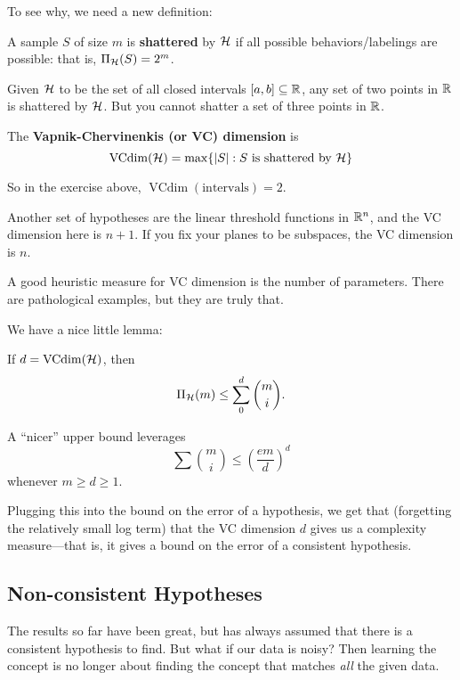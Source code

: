 \documentclass[12pt]{article}
\begin{document}
To see why, we need a new definition:
\begin{defn}
	A sample $S$ of size $m$ is \textbf{shattered} by $\mathcal{H}$ if all possible behaviors/labelings are possible: that is, $\Pi_{\mathcal{H}}(S)=2^m$.
\end{defn}
\begin{ex}
	Given $\mathcal{H}$ to be the set of all closed intervals $[a,b]\subseteq\mathbb{R}$, any set of two points in $\mathbb{R}$ is shattered by $\mathcal{H}$.
	But you cannot shatter a set of three points in $\mathbb{R}$.
\end{ex}
\begin{defn}
	The \textbf{Vapnik-Chervinenkis (or VC) dimension} is
	\[\operatorname{VCdim}(\mathcal{H})=\max\{|S|: S\text{ is shattered by }\mathcal{H}\}\]
\end{defn}
\begin{rmk}
	So in the exercise above, $\operatorname{VCdim}(\text{intervals})=2$.
\end{rmk}
Another set of hypotheses are the linear threshold functions in $\mathbb{R}^n$, and the VC dimension here is $n+1$. If you fix your planes to be subspaces, the VC dimension is $n$.

\begin{rmk}
	A good heuristic measure for VC dimension is the number of parameters. There are pathological examples, but they are truly that.
\end{rmk}

We have a nice little lemma:
\begin{lem}[Sauer]
	If $d=\operatorname{VCdim}(\mathcal{H})$, then 
	\[\Pi_{\mathcal{H}}(m)\le\sum_0^d\binom{m}{i}.\]
\end{lem}
\begin{rmk}
	A ``nicer'' upper bound leverages
	\[\sum\binom{m}{i}\le\left(\frac{em}{d}\right)^d\]
	whenever $m\ge d\ge 1$.
\end{rmk}

Plugging this into the bound on the error of a hypothesis, we get that (forgetting the relatively small log term) that the VC dimension $d$ gives us
a complexity measure---that is, it gives a bound on the error of a consistent hypothesis.

\subsection{Non-consistent Hypotheses}
The results so far have been great, but has always assumed that there is a consistent hypothesis to find. But what if our data is noisy? Then 
learning the concept is no longer about finding the concept that matches \textit{all} the given data.
\end{document}
